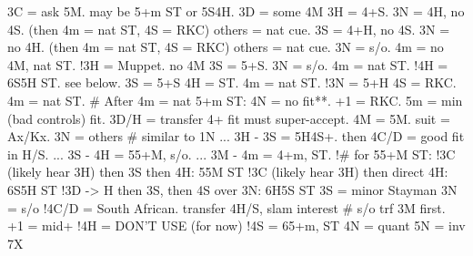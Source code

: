 3C = ask 5M. may be 5+m ST or 5S4H.
    3D = some 4M
        3H = 4+S.
            3N = 4H, no 4S. (then 4m = nat ST, 4S = RKC)
            others = nat cue.
        3S = 4+H, no 4S. 
            3N = no 4H. (then 4m = nat ST, 4S = RKC)
            others = nat cue.
        3N = s/o. 
        4m = no 4M, nat ST.
    !3H = Muppet. no 4M
        3S = 5+S. 3N = s/o. 4m = nat ST.
        !4H = 6S5H ST. see below.
    3S = 5+S
        4H = ST. 4m = nat ST.
    !3N = 5+H
        4S = RKC. 4m = nat ST.
    # After 4m = nat 5+m ST:
        4N = no fit**. +1 = RKC. 5m = min (bad controls) fit.
3D/H = transfer
    4+ fit must super-accept. 4M = 5M. suit = Ax/Kx. 3N = others  # similar to 1N
    ... 3H - 3S = 5H4S+. then 4C/D = good fit in H/S.
    ... 3S - 4H = 55+M, s/o.
    ... 3M - 4m = 4+m, ST.
    !# for 55+M ST:
        !3C (likely hear 3H) then 3S then 4H: 55M ST
        !3C (likely hear 3H) then direct 4H: 6S5H ST
        !3D -> H then 3S, then 4S over 3N: 6H5S ST
3S = minor Stayman
3N = s/o
!4C/D = South African. transfer 4H/S, slam interest  # s/o trf 3M first.
    +1 = mid+
!4H = DON'T USE (for now)
!4S = 65+m, ST
4N = quant
5N = inv 7X